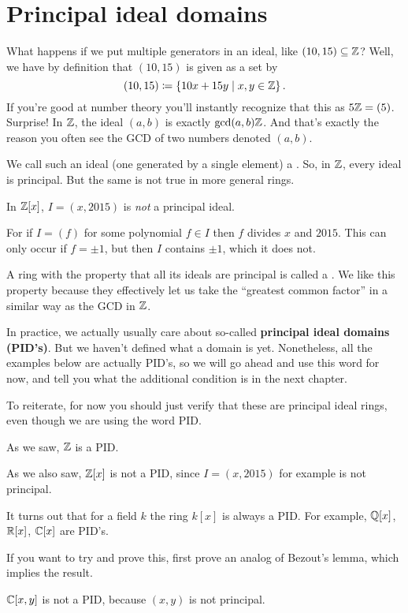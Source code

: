 \section{Principal ideal domains}

What happens if we put multiple generators in an ideal,
like $(10,15) \subseteq \mathbb Z$?
Well, we have by definition that $(10,15)$ is given as a set by
\[ (10,15) \coloneqq \left\{ 10x + 15y \mid x,y \in \mathbb Z \right\}.  \]
If you're good at number theory you'll instantly
recognize that this as $5\mathbb Z = (5)$.
Surprise! In $\mathbb Z$, the ideal $(a,b)$ is exactly $\gcd(a,b) \mathbb Z$.
And that's exactly the reason you often see the GCD of two numbers denoted $(a,b)$.

We call such an ideal (one generated by a single element) a .
So, in $\mathbb Z$, every ideal is principal.
But the same is not true in more general rings.
\begin{example}
	In $\mathbb Z[x]$, $I = (x,2015)$ is \emph{not} a principal ideal.

	For if $I = (f)$ for some polynomial $f \in I$
	then $f$ divides $x$ and $2015$.
	This can only occur if $f = \pm 1$,
	but then $I$ contains $\pm1$, which it does not.
\end{example}
A ring with the property that all its ideals
are principal is called a .
We like this property because they effectively
let us take the ``greatest common factor''
in a similar way as the GCD in $\mathbb Z$.

In practice, we actually usually care about
so-called \textbf{principal ideal domains (PID's)}.
But we haven't defined what a domain is yet.
Nonetheless, all the examples below are actually PID's,
so we will go ahead and use this word for now,
and tell you what the additional condition is in the next chapter.

\begin{example}
	To reiterate, for now you should just verify
	that these are principal ideal rings,
	even though we are using the word PID.
	\begin{enumerate}[(a)]
		\ii As we saw, $\mathbb Z$ is a PID.

		\ii As we also saw, $\mathbb Z[x]$ is not a PID,
		since $I = (x,2015)$ for example is not principal.

		\ii It turns out that for a field $k$
		the ring $k[x]$ is always a PID.
		For example, $\mathbb Q[x]$, $\mathbb R[x]$, $\mathbb C[x]$ are PID's.

		If you want to try and prove this,
		first prove an analog of Bezout's lemma,
		which implies the result.

		\ii $\mathbb C[x,y]$ is not a PID, because $(x,y)$
		is not principal.
	\end{enumerate}
\end{example}

